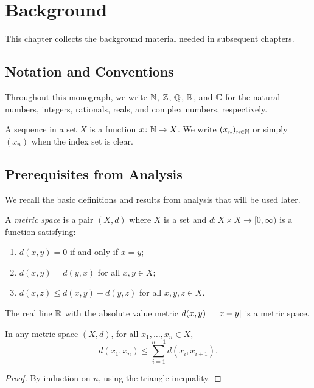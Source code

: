 
\chapter{Background}\label{cha:background}

This chapter collects the background material needed in subsequent chapters.

\section{Notation and Conventions}\label{sec:notation}

Throughout this monograph, we write $\mathbb{N}$, $\mathbb{Z}$, $\mathbb{Q}$, $\mathbb{R}$, and $\mathbb{C}$
for the natural numbers, integers, rationals, reals, and complex numbers,
respectively.

\begin{notation}\label{notn:sequences}
  A sequence in a set $X$ is a function $x \colon \mathbb{N} \to X$.
  We write $(x_n)_{n \in \mathbb{N}}$ or simply $(x_n)$ when the index set is clear.
\end{notation}

\section{Prerequisites from Analysis}\label{sec:prerequisites-analysis}

We recall the basic definitions and results from analysis that will be used later.

\begin{definition}\label{def:metric-space}
  A \emph{metric space} is a pair $(X, d)$ where $X$ is a set and
  $d \colon X \times X \to [0, \infty)$ is a function satisfying:
  \begin{enumerate}
    \item $d(x, y) = 0$ if and only if $x = y$;
    \item $d(x, y) = d(y, x)$ for all $x, y \in X$;
    \item $d(x, z) \le d(x, y) + d(y, z)$ for all $x, y, z \in X$.
  \end{enumerate}
\end{definition}

\begin{example}\label{exa:euclidean-metric}
  The real line $\mathbb{R}$ with the absolute value metric $d(x, y) = \lvert x - y\rvert$
  is a metric space.
\end{example}

\begin{lemma}\label{lem:triangle-inequality}
  In any metric space $(X, d)$, for all $x_1, \ldots, x_n \in X$,
  \begin{equation}\label{eq:generalized-triangle}
    d(x_1, x_n) \le \sum_{i=1}^{n-1} d(x_i, x_{i+1}).
  \end{equation}
\end{lemma}

\begin{proof}
  By induction on $n$, using the triangle inequality.
\end{proof}

